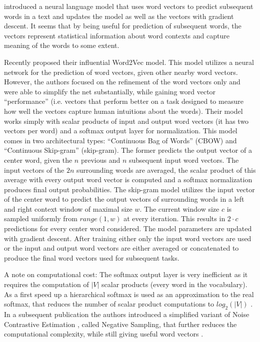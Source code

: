\documentclass[Thesis.tex]{subfiles}
\begin{document}
\citet{Bengio2003} introduced a neural language model that uses
word vectors to predict subsequent words in a text and updates the
model as well as the vectors with gradient descent. It seems that
by being useful for prediction of subsequent words, the vectors represent
statistical information about word contexts and capture meaning of
the words to some extent.

Recently \citet{Mikolov2013a} proposed their influential Word2Vec model.
This model utilizes a neural network for the prediction of word vectors,
given other nearby word vectors. However, the authors focused on the
refinement of the word vectors only and were able to simplify the
net substantially, while gaining word vector ``performance'' (i.e.
vectors that perform better on a task designed to measure how well
the vectors capture human intuitions about the words). Their model
works simply with scalar products of input and output word vectors
(it has two vectors per word) and a softmax output layer for normalization.
This model comes in two architectural types: ``Continuous Bag of Words''
(CBOW) and ``Continuous Skip-gram'' (skip-gram). The former predicts
the output vector of a center word, given the $n$ previous and
$n$ subsequent input word vectors. The input vectors of the $2n$
surrounding words are averaged, the scalar product of this average
with every output word vector is computed and a softmax normalization
produces final output probabilities. The skip-gram model utilizes
the input vector of the center word to predict the output vectors
of surrounding words in a left and right context window of maximal
size $w$. The current window size $c$ is sampled uniformly from
$range(1,w)$ at every iteration. This results in $2\cdot c$ predictions
for every center word considered. The model parameters are updated
with gradient descent. After training either only the input word vectors
are used or the input and output word vectors are either averaged
or concatenated to produce the final word vectors used for subsequent
tasks. 

A note on computational cost: The softmax output layer is very inefficient
as it requires the computation of $|V|$ scalar products (every word
in the vocabulary). As a first speed up a hierarchical softmax \citep{Morin2005} is
used as an approximation to the real softmax, that reduces the number
of scalar product computations to $log_{2}(|V|)$ \citep{Mikolov2013a}.
In a subsequent publication the authors introduced a
simplified variant of Noise Contrastive Estimation \citep{Gutmann2012}, called
Negative Sampling, that further reduces the computational complexity,
while still giving useful word vectors \citep{Mikolov2013b}. 
\end{document}
